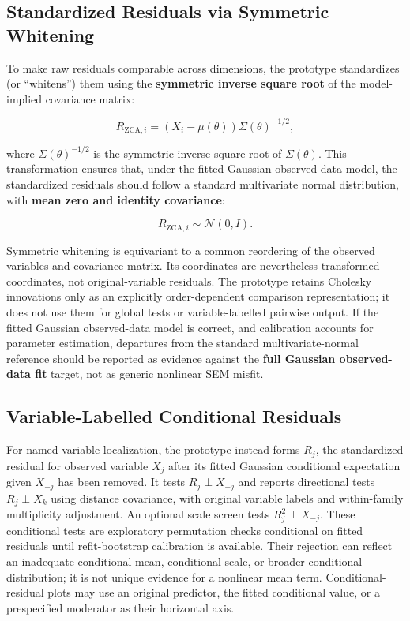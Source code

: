 \documentclass[floatsintext,a4paper]{apa7} %
\begin{document}
\subsection{Standardized Residuals via Symmetric Whitening}
To make raw residuals comparable across dimensions, the prototype standardizes (or ``whitens'') them using the \textbf{symmetric inverse square root} of the model-implied covariance matrix:
	
	$$
R_{\text{ZCA}, i} = (X_i - \mu(\theta))\Sigma(\theta)^{-1/2},
	$$
	
where $\Sigma(\theta)^{-1/2}$ is the symmetric inverse square root of $\Sigma(\theta)$. This transformation ensures that, under the fitted Gaussian observed-data model, the standardized residuals should follow a standard multivariate normal distribution, with \textbf{mean zero and identity covariance}:
	
	$$
R_{\text{ZCA}, i} \sim \mathcal{N}(0, I).
	$$
	
Symmetric whitening is equivariant to a common reordering of the observed variables and covariance matrix. Its coordinates are nevertheless transformed coordinates, not original-variable residuals. The prototype retains Cholesky innovations only as an explicitly order-dependent comparison representation; it does not use them for global tests or variable-labelled pairwise output. If the fitted Gaussian observed-data model is correct, and calibration accounts for parameter estimation, departures from the standard multivariate-normal reference should be reported as evidence against the \textbf{full Gaussian observed-data fit} target, not as generic nonlinear SEM misfit.

\subsection{Variable-Labelled Conditional Residuals}
For named-variable localization, the prototype instead forms $R_j$, the standardized residual for observed variable $X_j$ after its fitted Gaussian conditional expectation given $X_{-j}$ has been removed. It tests $R_j \perp X_{-j}$ and reports directional tests $R_j \perp X_k$ using distance covariance, with original variable labels and within-family multiplicity adjustment. An optional scale screen tests $R_j^2 \perp X_{-j}$. These conditional tests are exploratory permutation checks conditional on fitted residuals until refit-bootstrap calibration is available. Their rejection can reflect an inadequate conditional mean, conditional scale, or broader conditional distribution; it is not unique evidence for a nonlinear mean term. Conditional-residual plots may use an original predictor, the fitted conditional value, or a prespecified moderator as their horizontal axis.
	
\end{document}
